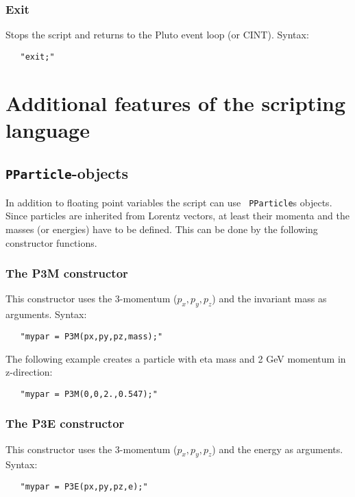 {\subsubsection{Exit}

Stops the script and returns to the Pluto event loop (or CINT).
Syntax:

\begin{verbatim}
   "exit;"
\end{verbatim}

\section{Additional features of the scripting language}
\label{sec:add_features}

\subsection{\texttt{PParticle}-objects}

In addition to floating point variables the script can use {\tt
  PParticle}s objects. Since particles are inherited from Lorentz
vectors, at least their momenta and the masses (or energies) have to be
defined. This can be  done by the following constructor functions.

\subsubsection{The P3M constructor}

This constructor uses the 3-momentum ($p_x,p_y,p_z$) and the invariant mass as
arguments.  Syntax:

\begin{verbatim}
   "mypar = P3M(px,py,pz,mass);"
\end{verbatim}

The following example creates a particle with eta mass and 2 GeV momentum in z-direction:

\begin{verbatim}
   "mypar = P3M(0,0,2.,0.547);"
\end{verbatim}

\subsubsection{The P3E constructor}

This constructor uses the 3-momentum ($p_x,p_y,p_z$) and the energy as
arguments.  Syntax:

\begin{verbatim}
   "mypar = P3E(px,py,pz,e);"
\end{verbatim}

}
